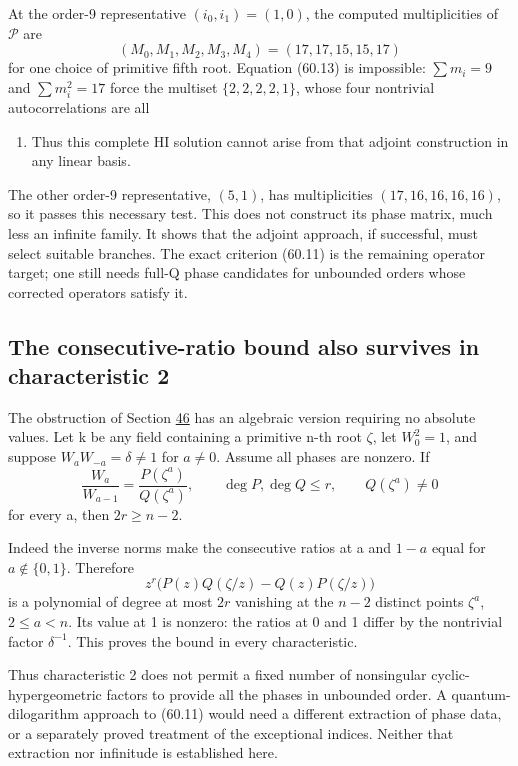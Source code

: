 \documentclass[11pt,reqno]{amsart}
\theoremstyle{plain}
\begin{document}
At the order-9 representative \((i_0,i_1)=(1,0)\), the computed
multiplicities of \(\mathcal P\) are
\[
 (M_0,M_1,M_2,M_3,M_4)=(17,17,15,15,17)
\]
for one choice of primitive fifth root. Equation (60.13) is impossible:
\(\sum m_i=9\) and \(\sum m_i^2=17\) force the multiset
\(\{2,2,2,2,1\}\), whose four nontrivial autocorrelations are all
\begin{enumerate}
\item Thus this complete HI solution cannot arise from that adjoint
construction in any linear basis.
\end{enumerate}

The other order-9 representative, \((5,1)\), has multiplicities
\((17,16,16,16,16)\), so it passes this necessary test. This does
not construct its phase matrix, much less an infinite family. It
shows that the adjoint approach, if successful, must select suitable
branches. The exact criterion (60.11) is the remaining operator target;
one still needs full-Q phase candidates for unbounded orders whose
corrected operators satisfy it.

\subsection{The consecutive-ratio bound also survives in characteristic 2}\label{sec:60.4}

The obstruction of Section \hyperref[sec:46]{46} has an algebraic version requiring no
absolute values. Let k be any field containing a primitive n-th root
\(\zeta\), let \(W_0^2=1\), and suppose
\(W_aW_{-a}=\delta\ne1\) for \(a\ne0\). Assume all phases are
nonzero. If
\[
 \frac{W_a}{W_{a-1}}=\frac{P(\zeta^a)}{Q(\zeta^a)},\qquad
 \deg P,\deg Q\le r,\qquad Q(\zeta^a)\ne0
\]
for every a, then \(2r\ge n-2\).

Indeed the inverse norms make the consecutive ratios at a and
\(1-a\) equal for \(a\notin\{0,1\}\). Therefore
\[
 z^r\bigl(P(z)Q(\zeta/z)-Q(z)P(\zeta/z)\bigr)
\]
is a polynomial of degree at most \(2r\) vanishing at the \(n-2\)
distinct points \(\zeta^a\), \(2\le a<n\). Its value at 1 is
nonzero: the ratios at 0 and 1 differ by the nontrivial factor
\(\delta^{-1}\). This proves the bound in every characteristic.

Thus characteristic 2 does not permit a fixed number of nonsingular
cyclic-hypergeometric factors to provide all the phases in unbounded
order. A quantum-dilogarithm approach to (60.11) would need a different
extraction of phase data, or a separately proved treatment of the
exceptional indices. Neither that extraction nor infinitude is
established here.
\end{document}
